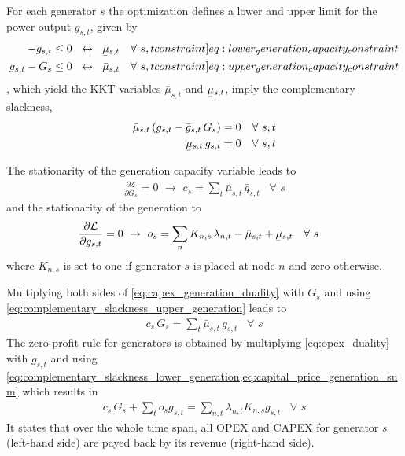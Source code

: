 \documentclass[11pt,twocolumn]{article}
\newcommand{\ubar}[1]{\underaccent{\bar}{#1}}
\newcommand{\resultsin}[1]{\hspace{6pt} \leftrightarrow  \hspace{6pt} #1}
\newcommand{\Forall}[1]{\hspace{10pt} \forall \,\, #1 }
\newcommand{\pdv}[2]{\frac{\partial #1}{\partial #2}}
\newcommand{\generation}{g_{s,t}}
\newcommand{\generationpotential}{\bar{g}_{s,t}}
\newcommand{\capacitygeneration}{G_{s}}
\newcommand{\operationalpricegeneration}{o_{s}}
\newcommand{\capitalpricegeneration}{c_{s}}
\newcommand{\mulowergeneration}{\ubar{\mu}_{s,t}}
\newcommand{\muuppergeneration}{\bar{\mu}_{s,t}}
\newcommand{\lagrangian}{\mathcal{L}}
\newcommand{\lmp}[1][n]{\lambda_{#1,t}}
\newcommand{\incidencegenerator}[1][n]{K_{#1,s}}
\begin{document}
For each generator $s$ the optimization defines a lower and upper limit for the power output $\generation$, given by
\begin{align}
    - \generation                     & \le 0 \resultsin{\mulowergeneration} \Forall{s,t}
    \label[constraint]{eq:lower_generation_capacity_constraint}                           \\
    \generation - \capacitygeneration & \le 0 \resultsin{\muuppergeneration} \Forall{s,t}
    \label[constraint]{eq:upper_generation_capacity_constraint}
\end{align}
, which yield the \ac{KKT} variables $\muuppergeneration$ and $\mulowergeneration$, imply the complementary slackness,
\begin{align}
    \muuppergeneration \left( \generation - \generationpotential \, \capacitygeneration \right) & = 0  \Forall{s,t}
    \label{eq:complementary_slackness_upper_generation}                                                             \\
    \mulowergeneration  \, \generation                                                          & = 0 \Forall{s,t}
    \label{eq:complementary_slackness_lower_generation}
\end{align}


The stationarity of the generation capacity variable leads to
\begin{align}
    \pdv{\lagrangian}{\capacitygeneration}  = 0 \,\, \rightarrow \,\,
    \capitalpricegeneration =  \sum_t \muuppergeneration \, \generationpotential  \Forall{s}
    \label{eq:capex_generation_duality}
\end{align}
and the stationarity of the generation to
\begin{align}
    \pdv{\lagrangian}{\generation} & = 0 \,\, \rightarrow \,\,
    \operationalpricegeneration =  \sum_n \incidencegenerator \, \lmp - \muuppergeneration + \mulowergeneration \Forall{s} \label{eq:opex_duality}
\end{align}
where $\incidencegenerator$ is set to one if generator $s$ is placed at node $n$ and zero otherwise.

Multiplying both sides of \cref{eq:capex_generation_duality} with $\capacitygeneration$ and using \cref{eq:complementary_slackness_upper_generation} leads to
\begin{align}
    \capitalpricegeneration \, \capacitygeneration  = \sum_t \muuppergeneration \, \generation \Forall{s}
    \label{eq:capital_price_generation_sum}
\end{align}
The zero-profit rule for generators is obtained by multiplying \cref{eq:opex_duality} with $\generation$ and using \cref{eq:complementary_slackness_lower_generation,eq:capital_price_generation_sum} which results in
\begin{align}
    \capitalpricegeneration \, \capacitygeneration + \sum_t \operationalpricegeneration \generation = \sum_{n,t} \lmp \incidencegenerator \generation \Forall{s}
\end{align}
It states that over the whole time span, all \ac{OPEX} and \ac{CAPEX} for generator $s$ (left-hand side) are payed back by its revenue (right-hand side).
\end{document}
